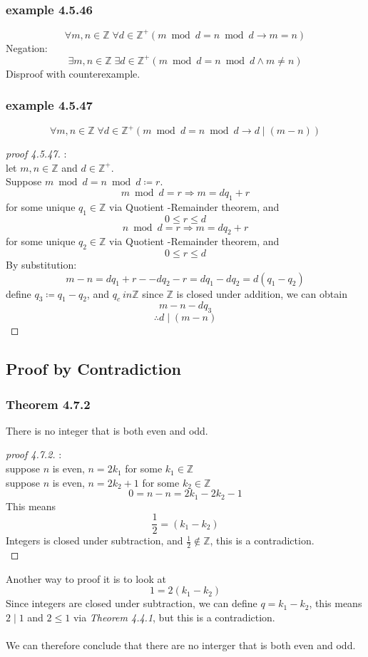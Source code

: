 \documentclass[12pt]{book}
\newcommand{\Z}{\mathbb{Z}}
\newcommand{\paren}[1]{\left( #1 \right)}
\begin{document}
\subsubsection{example 4.5.46}
\[
\forall m,n \in \Z \; \forall d \in \Z^+ 
\paren{m \bmod d = n \bmod d \rightarrow m=n}
\]
Negation:
\[
\exists m,n \in \Z \; \exists d \in \Z^+
\paren{m \bmod d = n \bmod d \wedge m \neq n}
\]
Disproof with counterexample. 

\newpage
\subsubsection{example 4.5.47}
\[
\forall m,n \in \Z \; \forall d \in \Z^+ 
\paren{m \bmod d = n \bmod d \rightarrow d \mid \paren{m-n}}
\]

\begin{proof}[proof 4.5.47]:\\
    let $m,n \in \Z$ and $d \in \Z^+$.\\
    Suppose $m \bmod d = n \bmod d \coloneqq r$.
    \[
    m\bmod d = r \Rightarrow m = dq_1 + r
    \]
    for some unique $q_1 \in \Z$ via Quotient -Remainder theorem, and 
    \[
    0 \leq r \leq d
    \]
    \[
    n\bmod d = r \Rightarrow m = dq_2 + r
    \]
    for some unique $q_2 \in \Z$ via Quotient -Remainder theorem, and 
    \[ 
    0 \leq r \leq d
    \]
    By substitution:
    \[
    m-n = dq_1 +r - - dq_2 - r = dq_1 - dq_2 = d(q_1 - q_2)
    \]
    define $q_3 \coloneqq q_1 - q_2$, and $q_c \ in \Z$ since $\Z$ is closed under addition, we can obtain
    \[
    m-n - dq_3
    \]
    \[
    \therefore d \mid \paren{m-n}
    \]
    
\end{proof}

\newpage
\subsection{Proof by Contradiction}
\subsubsection{Theorem 4.7.2}
There is no integer that is both even and odd.
\begin{proof}[proof 4.7.2]:\\
    suppose $n$ is even, $n = 2k_1$ for some $k_1 \in \Z$\\
    suppose $n$ is even, $n = 2k_2+1$ for some $k_2 \in \Z$\\
    \[
    0 = n-n = 2k_1 - 2k_2 - 1
    \]
    This means
    \[
    \frac{1}{2}= \paren{k_1 - k_2}
    \]
    Integers is closed under subtraction, and $\frac{1}{2} \notin \Z$, this is a contradiction. \\
\end{proof}
Another way to proof it is to look at 
\[
1 = 2\paren{k_1 - k_2}
\]
Since integers are closed under subtraction, we can define $q = k_1 - k_2$, this means $2 \mid 1$ and $2 \leq 1$ via \textit{Theorem 4.4.1}, but this is a contradiction. \\
\\
We can therefore conclude that there are no interger that is both even and odd. 
\end{document}
